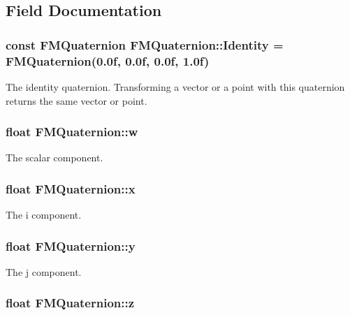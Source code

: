 \subsection{Field Documentation}
\hypertarget{classFMQuaternion_a7dccc8f53d6f730b27f784416a53052b}{
\subsubsection[{Identity}]{\setlength{\rightskip}{0pt plus 5cm}const {\bf FMQuaternion} {\bf FMQuaternion::Identity} = {\bf FMQuaternion}(0.0f, 0.0f, 0.0f, 1.0f)}}
\label{classFMQuaternion_a7dccc8f53d6f730b27f784416a53052b}
The identity quaternion. Transforming a vector or a point with this quaternion returns the same vector or point. \hypertarget{classFMQuaternion_ac60123167417258df35a27db4d3e7646}{
\subsubsection[{w}]{\setlength{\rightskip}{0pt plus 5cm}float {\bf FMQuaternion::w}}}
\label{classFMQuaternion_ac60123167417258df35a27db4d3e7646}
The scalar component. \hypertarget{classFMQuaternion_a036c642a43fb84dc5544eb4ce0e0828d}{
\subsubsection[{x}]{\setlength{\rightskip}{0pt plus 5cm}float {\bf FMQuaternion::x}}}
\label{classFMQuaternion_a036c642a43fb84dc5544eb4ce0e0828d}
The i component. \hypertarget{classFMQuaternion_a996bf6bcb013dbbbe8e255c35e085f81}{
\subsubsection[{y}]{\setlength{\rightskip}{0pt plus 5cm}float {\bf FMQuaternion::y}}}
\label{classFMQuaternion_a996bf6bcb013dbbbe8e255c35e085f81}
The j component. \hypertarget{classFMQuaternion_a03d06578ec64cf8a4d2032c336153244}{
\subsubsection[{z}]{\setlength{\rightskip}{0pt plus 5cm}float {\bf FMQuaternion::z}}}

